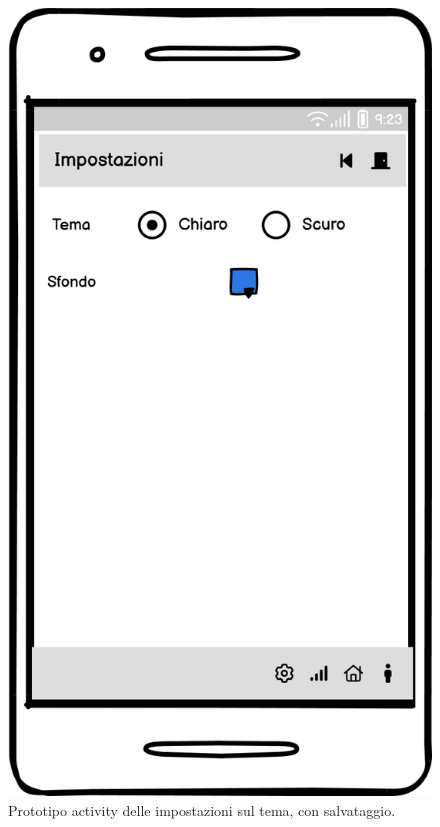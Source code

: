 \documentclass[a4paper,final,12pt]{report}
\begin{document}
\begin{figure}[hbtp]
\centering
\includegraphics[scale=0.28]{img_concettuale/Imp_tema_mob.png}
\caption{Prototipo activity delle impostazioni sul tema, con salvataggio.}
\label{figura:mockimpsdc2}
\end{figure}
\end{document}
